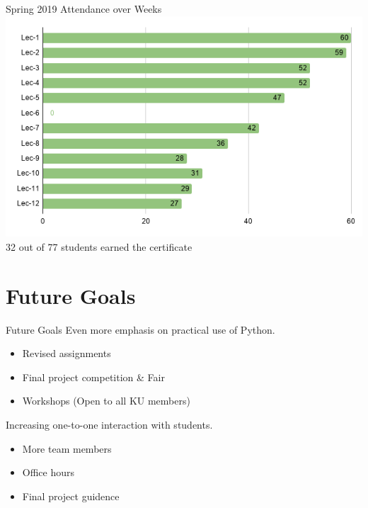       \begin{frame}{Spring 2019 Attendance over Weeks}
        \centering
        \includegraphics[height=0.75\textheight]{images/attendance.png}
        \LARGE
        \\
        32 out of 77 students earned the certificate
      \end{frame}

    \section{Future Goals}
      
    

    \begin{frame}{Future Goals}
        \pause
        \LARGE
        Even more emphasis on practical use of Python.
        \pause
        \begin{itemize}
          \item Revised assignments
          \pause
          \item Final project competition \& Fair
          \pause
          \item Workshops (Open to all KU members)
        \end{itemize}
        
        \pause
        Increasing one-to-one interaction with students.
        \begin{itemize}
          \item More team members
          \pause
          \item Office hours
          \pause
          \item Final project guidence
        \end{itemize}
      \end{frame}

